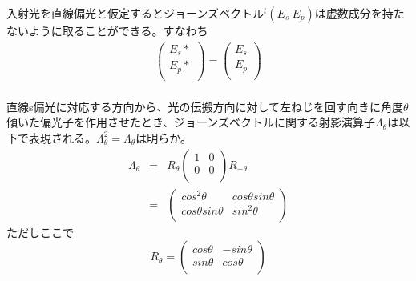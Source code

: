 \documentclass[11pt]{article}
\begin{document}
 入射光を直線偏光と仮定するとジョーンズベクトル$^t(E_s\ E_p)$は虚数成分を持たないように取ることができる。すなわち
  \begin{eqnarray*}
  \left(
    \begin{array}{c}
      E_s* \\
      E_p* \\
    \end{array} 
  \right) 
  = 
   \left(
    \begin{array}{c}
      E_s\\
      E_p\\
    \end{array} 
  \right) \\
\end{eqnarray*}

直線s偏光に対応する方向から、光の伝搬方向に対して左ねじを回す向きに角度$\theta$傾いた偏光子を作用させたとき、ジョーンズベクトルに関する射影演算子$\Lambda_{\theta}$は以下で表現される。$\Lambda_{\theta}^2=\Lambda_{\theta}$は明らか。
\begin{eqnarray*}
\Lambda_{\theta} 
&=&
  R_{\theta}
  \left(
    \begin{array}{cc}
      1 & 0 \\
      0 & 0 \\
    \end{array}
  \right)
  R_{-\theta}\\
&=&
  \left(
    \begin{array}{cc}
      cos^2\theta & cos\theta sin\theta \\
      cos\theta sin\theta & sin^2\theta \\
    \end{array}
  \right)
\end{eqnarray*}
ただしここで
\[
R_{\theta} =
  \left(
    \begin{array}{cc}
      cos\theta & -sin\theta \\
      sin\theta & cos\theta \\
    \end{array}
  \right)
\]
\\
\end{document}

